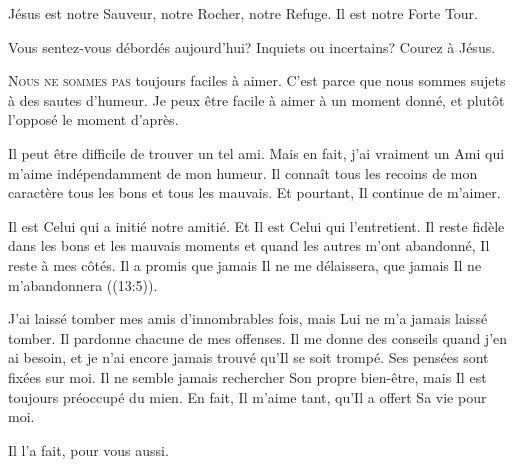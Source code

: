 Jésus est notre Sauveur, notre Rocher, notre Refuge. Il est notre Forte Tour. 

Vous sentez-vous débordés aujourd'hui? Inquiets 
 ou incertains? Courez à Jésus. 

\dvrule







\lettrine{N}{ous ne sommes pas} toujours faciles à aimer.
 C'est parce que nous sommes sujets à des sautes d'humeur.
 Je peux être facile à aimer à un moment donné,
 et plutôt l'opposé le moment d'après.


Il peut être difficile de trouver un tel ami. Mais en fait,
 j'ai vraiment un Ami qui m'aime indépendamment de mon humeur.
 Il connaît tous les recoins de mon caractère
 \ocadr tous les bons et tous les mauvais.
 Et pourtant, Il continue de m'aimer.

Il est Celui qui a initié notre amitié. Et Il est Celui qui l'entretient.
 Il reste fidèle dans les bons et les mauvais moments et quand les autres
 m'ont abandonné, Il reste à mes côtés. Il a promis que jamais
 Il ne me délaissera, que jamais Il ne m'abandonnera ((13:5)).

J'ai laissé tomber mes amis d'innombrables fois, mais Lui ne m'a jamais laissé
 tomber. Il pardonne chacune de mes offenses. Il me donne des conseils
 quand j'en ai besoin, et je n'ai encore jamais trouvé qu'Il se soit trompé.
 Ses pensées sont fixées sur moi. 
 Il ne semble jamais rechercher 
 Son propre bien-être, mais Il est toujours préoccupé du mien.
 En fait, Il m'aime tant, qu'Il a offert Sa vie pour moi.

Il l'a fait, pour vous aussi.

\dvrule



